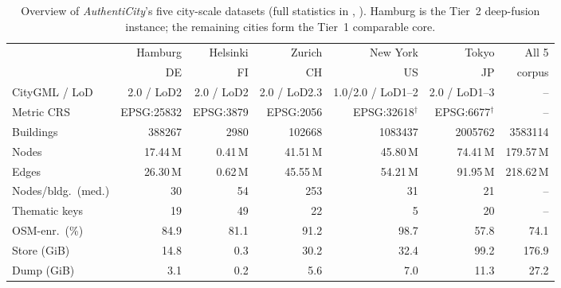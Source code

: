 \documentclass[sigconf,authordraft]{acmart}
\newcommand{\benchname}{\textit{Authenti\-City}}
\begin{document}
\begin{table}[h!]
  \caption{
    Overview of \benchname{}'s five city-scale datasets (full statistics in , ). Hamburg is the Tier~2 deep-fusion instance; the remaining cities form the Tier~1 comparable core. 
    }
  \label{tab:city_summary}
  \setlength{\tabcolsep}{5pt}
  \begin{tabular}{l rrrrr r}
    \toprule
    & Hamburg & Helsinki & Zurich & New York & Tokyo & All 5 \\
    & \small DE & \small FI & \small CH & \small US & \small JP & \small corpus \\
    \midrule
    CityGML / LoD        & 2.0 / LoD2 & 2.0 / LoD2 & 2.0 / LoD2.3 & 1.0/2.0 / LoD1--2 & 2.0 / LoD1--3 & -- \\
    Metric CRS           & EPSG:25832 & EPSG:3879 & EPSG:2056 & EPSG:32618$^\dagger$ & EPSG:6677$^\dagger$ & -- \\
    Buildings            & \num{388267} & \num{2980} & \num{102668} & \num{1083437} & \num{2005762} & \num{3583114} \\
    Nodes                & 17.44\,M & 0.41\,M & 41.51\,M & 45.80\,M & 74.41\,M & 179.57\,M \\
    Edges                & 26.30\,M & 0.62\,M & 45.55\,M & 54.21\,M & 91.95\,M & 218.62\,M \\
    Nodes/bldg.\ (med.)  & 30 & 54 & 253 & 31 & 21 & -- \\
    Thematic keys        & 19 & 49 & 22 & 5 & 20 & -- \\
    OSM-enr.\ (\%)       & 84.9 & 81.1 & 91.2 & 98.7 & 57.8 & 74.1 \\
    Store (GiB)          & 14.8 & 0.3 & 30.2 & 32.4 & 99.2 & 176.9 \\
    Dump (GiB)           & 3.1 & 0.2 & 5.6 & 7.0 & 11.3 & 27.2 \\
    \bottomrule
  \end{tabular}
  

\end{table}
\end{document}
